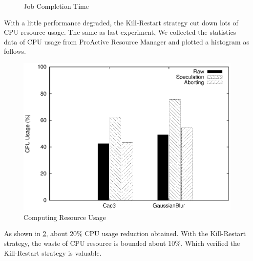 \begin{figure}
\centering
{}
\caption{Job Completion Time}
\label{figure:abort_completiontime}
\end{figure}

With a little performance degraded, the Kill-Restart strategy cut down lots of CPU resource usage. The same as last experiment, We collected the statistics data of CPU usage from ProActive Resource Manager and plotted a histogram as follows.

\begin{figure}
\centering
\includegraphics[width=0.9\columnwidth]{figures/abort_resource_usage.eps}
\caption{Computing Resource Usage}
\label{figure:abort_resourceusage}
\end{figure}

As shown in \ref{figure:abort_resourceusage}, about 20\% CPU usage reduction obtained. With the Kill-Restart strategy, the waste of CPU resource is bounded about 10\%, Which verified the Kill-Restart strategy is valuable.

